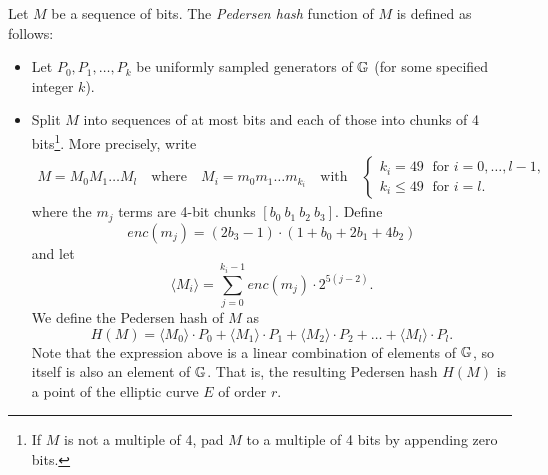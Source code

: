 Let $M$ be a sequence of bits. %
The {\it Pedersen hash} function of $M$ is defined as follows:
\begin{itemize}
	\item Let $P_0,P_1,\dots,P_k$ be uniformly sampled generators of $\mathbb{G}$ (for some specified integer $k$). 
	\item   Split $M$ into sequences of at most bits and each of those into chunks of 4 bits{\footnote{If $M$ is not a multiple of 4, pad $M$ to a multiple of 4 bits by appending zero bits.}}. 
	More precisely, write  
	\begin{gather*}
		M = M_0M_1\dots M_l 
		\quad\text{where}\quad
		M_i = m_0m_1\dots m_{k_i}
		\quad\text{with}\quad 
		\begin{cases}
			k_i = 49 	\;\text{ for }  i = 0, \dots, l-1, \\
			k_i \leq 49 \;\text{ for }  i = l.
		\end{cases}
	\end{gather*}
	where the $m_j$ terms are 4-bit chunks $[b_0\: b_1\: b_2\: b_3]$. 
	Define  
	$$ enc(m_j) = (2b_3-1) 
		\cdot (1+b_{0}+2b_{1}+4b_{2}) $$
	and let 
	$$ \langle M_i \rangle = \sum_{j=0}^{k_i-1} enc(m_j) \cdot 2^{5(j-2)}.	$$
	We define the Pedersen hash of $M$ as
	\begin{equation}
	\label{eq-ped}
		H(M) = \langle M_0 \rangle \cdot P_0 
		+  \langle M_1 \rangle \cdot P_1 
		+  \langle M_2 \rangle \cdot P_2 
		+ \dots + \langle M_l \rangle \cdot P_l.	
	\end{equation}
	Note that the expression above is a linear combination of elements of $\mathbb{G}$, 
	so itself is also an element of $\mathbb{G}$. 
	That is, the resulting Pedersen hash $H(M)$ is a point of the elliptic curve $E$ of order $r$.
\end{itemize}